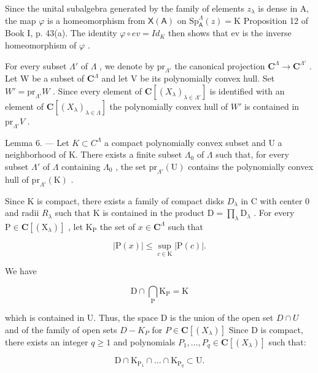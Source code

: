 Since the unital subalgebra generated by the family of elements \(z_{\lambda}\) is dense in A, the map \(\varphi\) is a homeomorphism from \(\mathsf{X}(\mathsf{A})\) on \(\mathrm{Sp}_{\mathsf{A}}^{\Lambda}(z)=\mathrm{K}\) Proposition 12 of Book I, p. 43(a). The identity \(\varphi\circ ev=Id_{K}\) then shows that ev is the inverse homeomorphism of \(\varphi\) .

For every subset \(\Lambda'\) of \(\Lambda\) , we denote by \(\mathrm{pr}_{\Lambda'}\) the canonical projection \(\mathbf{C}^{\Lambda} \to \mathbf{C}^{\Lambda'}\) . Let W be a subset of \(\mathbf{C}^{\Lambda}\) and let V be its polynomially convex hull. Set \(W' = \mathrm{pr}_{\Lambda'} W\) . Since every element of \(\mathbf{C}[(X_{\lambda})_{\lambda \in \Lambda'}]\) is identified with an element of \(\mathbf{C}[(X_{\lambda})_{\lambda \in \Lambda}]\) the polynomially convex hull of \(W'\) is contained in \(\mathrm{pr}_{\Lambda'} V\) .

Lemma 6. --- Let \(K \subset C^{\Lambda}\) a compact polynomially convex subset and U a neighborhood of K. There exists a finite subset \(\Lambda_{0}\) of \(\Lambda\) such that, for every subset \(\Lambda'\) of \(\Lambda\) containing \(\Lambda_{0}\) , the set \(\mathrm{pr}_{\Lambda'}(\mathrm{U})\) contains the polynomially convex hull of \(\mathrm{pr}_{\Lambda'}(\mathrm{K})\) .

Since K is compact, there exists a family of compact disks \(D_{\lambda}\) in C with center 0 and radii \(R_{\lambda}\) such that K is contained in the product \(\mathrm{D} = \prod_{\lambda} \mathrm{D}_{\lambda}\) . For every \(\mathrm{P} \in \mathbf{C}[(\mathrm{X}_{\lambda})]\) , let \(\mathrm{K}_{\mathrm{P}}\) the set of \(x \in \mathbf{C}^{\Lambda}\) such that

\[
| \mathrm{P} (x) | \leqslant \sup _ {c \in \mathrm{K}} | \mathrm{P} (c) |.
\]

We have

\[
\mathrm{D} \cap \bigcap_ {\mathrm{P}} \mathrm{K} _ {\mathrm{P}} = \mathrm{K}\tag{3}
\]

which is contained in U. Thus, the space D is the union of the open set \(D \cap U\) and of the family of open sets \(D - K_{P}\) for \(P \in \mathbf{C}[(X_{\lambda})]\) Since D is compact, there exists an integer \(q \geqslant 1\) and polynomials \(P_{1}, \ldots, P_{q} \in \mathbf{C}[(X_{\lambda})]\) such that:

\[
\mathrm{D} \cap \mathrm{K} _ {\mathrm{P} _ {1}} \cap \dots \cap \mathrm{K} _ {\mathrm{P} _ {q}} \subset \mathrm{U}.\tag{4}
\]

